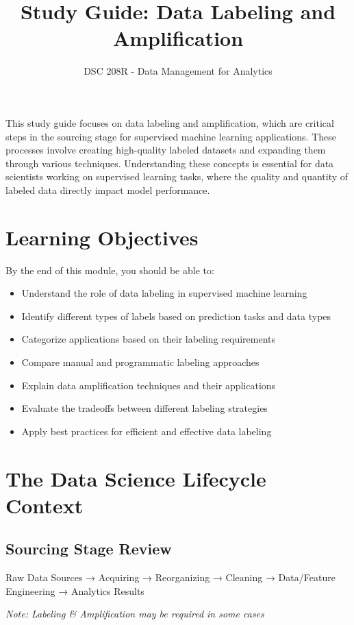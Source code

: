 \documentclass[12pt]{article}
\title{Study Guide: Data Labeling and Amplification}
\author{DSC 208R - Data Management for Analytics}
\date{}
\begin{document}
\maketitle

\begin{tcolorbox}[colback=blue!5!white,colframe=blue!75!black,title={Overview}]
This study guide focuses on data labeling and amplification, which are critical steps in the sourcing stage for supervised machine learning applications. These processes involve creating high-quality labeled datasets and expanding them through various techniques. Understanding these concepts is essential for data scientists working on supervised learning tasks, where the quality and quantity of labeled data directly impact model performance.
\end{tcolorbox}

\section{Learning Objectives}

By the end of this module, you should be able to:

\begin{itemize}
    \item Understand the role of data labeling in supervised machine learning
    \item Identify different types of labels based on prediction tasks and data types
    \item Categorize applications based on their labeling requirements
    \item Compare manual and programmatic labeling approaches
    \item Explain data amplification techniques and their applications
    \item Evaluate the tradeoffs between different labeling strategies
    \item Apply best practices for efficient and effective data labeling
\end{itemize}

\section{The Data Science Lifecycle Context}

\subsection{Sourcing Stage Review}
\begin{tcolorbox}[colback=green!5!white,colframe=green!75!black,title={Sourcing Process Flow}]
Raw Data Sources → Acquiring → Reorganizing → Cleaning → Data/Feature Engineering → Analytics Results

\textit{Note: Labeling \& Amplification may be required in some cases}
\end{tcolorbox}
\end{document}
